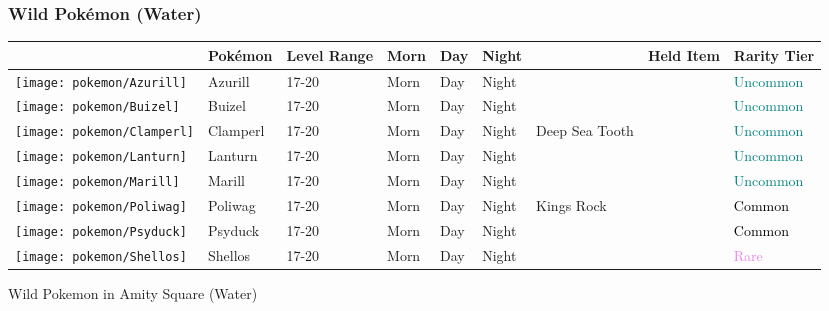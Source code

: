 \subsubsection{Wild Pokémon (Water)}%
\label{ssubsec:WildPokmon(Water)}%
\begin{longtable}{||l l l l l l l l l||}%
\hline%
&Pokémon&Level Range&Morn&Day&Night&&Held Item&Rarity Tier\\%
\hline%
\endhead%
\hline%
\texttt{[image: pokemon/Azurill]}&Azurill&17{-}20&Morn&Day&Night&&&\textcolor{teal}{%
Uncommon%
}\\%
\hline%
\texttt{[image: pokemon/Buizel]}&Buizel&17{-}20&Morn&Day&Night&&&\textcolor{teal}{%
Uncommon%
}\\%
\hline%
\texttt{[image: pokemon/Clamperl]}&Clamperl&17{-}20&Morn&Day&Night&Deep Sea Tooth&&\textcolor{teal}{%
Uncommon%
}\\%
\hline%
\texttt{[image: pokemon/Lanturn]}&Lanturn&17{-}20&Morn&Day&Night&&&\textcolor{teal}{%
Uncommon%
}\\%
\hline%
\texttt{[image: pokemon/Marill]}&Marill&17{-}20&Morn&Day&Night&&&\textcolor{teal}{%
Uncommon%
}\\%
\hline%
\texttt{[image: pokemon/Poliwag]}&Poliwag&17{-}20&Morn&Day&Night&Kings Rock&&\textcolor{black}{%
Common%
}\\%
\hline%
\texttt{[image: pokemon/Psyduck]}&Psyduck&17{-}20&Morn&Day&Night&&&\textcolor{black}{%
Common%
}\\%
\hline%
\texttt{[image: pokemon/Shellos]}&Shellos&17{-}20&Morn&Day&Night&&&\textcolor{violet}{%
Rare%
}\\%
\hline%
\end{longtable}%
\caption{Wild Pokemon in Amity Square (Water)}